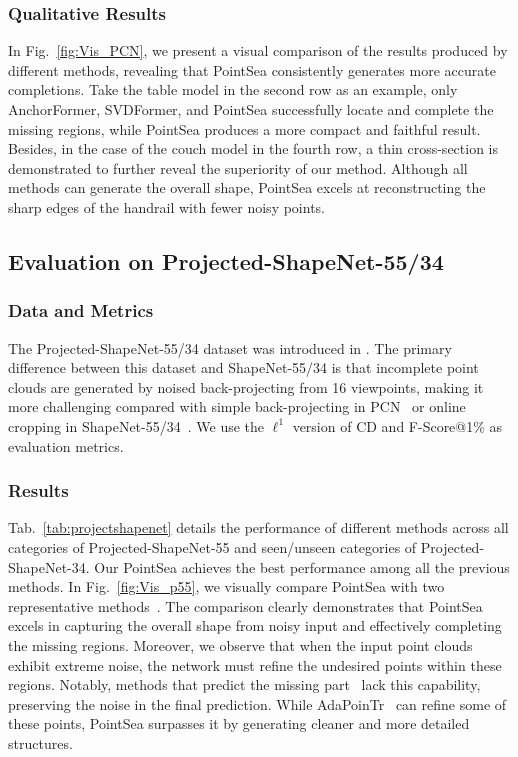 \subsubsection{Qualitative Results}
In Fig.~\ref{fig:Vis_PCN}, we present a visual comparison of the results produced by different methods, revealing that PointSea consistently generates more accurate completions. Take the table model in the second row as an example, only AnchorFormer, SVDFormer, and PointSea successfully locate and complete the missing regions, while PointSea produces a more compact and faithful result. 
Besides, in the case of the couch model in the fourth row, a thin cross-section is demonstrated to further reveal the superiority of our method. Although all methods can generate the overall shape, PointSea excels at reconstructing the sharp edges of the handrail with fewer noisy points.

\subsection{Evaluation on Projected-ShapeNet-55/34}
\subsubsection{Data and Metrics}
The Projected-ShapeNet-55/34 dataset was introduced in \citep{10232862}. The primary difference between this dataset and ShapeNet-55/34 is that incomplete point clouds are generated by noised back-projecting from 16 viewpoints, making it more challenging compared with simple back-projecting in PCN~\citep{yuan2018pcn} or online cropping in ShapeNet-55/34~\citep{10232862}. We use the $\displaystyle \ell ^{1}$ version of CD and F-Score@1\% as evaluation metrics.
\subsubsection{Results}
Tab.~\ref{tab:projectshapenet} details the performance of different methods across all categories of Projected-ShapeNet-55 and seen/unseen categories of Projected-ShapeNet-34. Our PointSea achieves the best performance among all the previous methods.
In Fig.~\ref{fig:Vis_p55}, we visually compare PointSea with two representative methods~\citep{10232862,chen2023anchorformer}. The comparison clearly demonstrates that PointSea excels in capturing the overall shape from noisy input and effectively completing the missing regions.
Moreover, we observe that when the input point clouds exhibit extreme noise, the network must refine the undesired points within these regions. Notably, methods that predict the missing part~\citep{yu2021pointr,chen2023anchorformer} lack this capability, preserving the noise in the final prediction. While AdaPoinTr~\citep{10232862} can refine some of these points, PointSea surpasses it by generating cleaner and more detailed structures.

